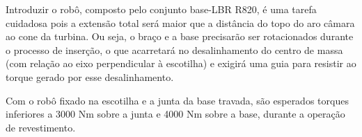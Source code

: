 Introduzir o robô, composto pelo conjunto base-LBR R820, é uma tarefa cuidadosa
pois a extensão total será maior que a distância do topo do aro câmara ao
cone da turbina. Ou seja, o braço e a base precisarão ser rotacionados
durante o processo de inserção, o que acarretará no desalinhamento do centro de
massa (com relação ao eixo perpendicular à escotilha) e exigirá uma guia para
resistir ao torque gerado por esse desalinhamento.

Com o robô fixado na escotilha e a junta da base travada, são esperados torques
inferiores a 3000 Nm sobre a junta e 4000 Nm sobre a base, durante a operação de
revestimento.


